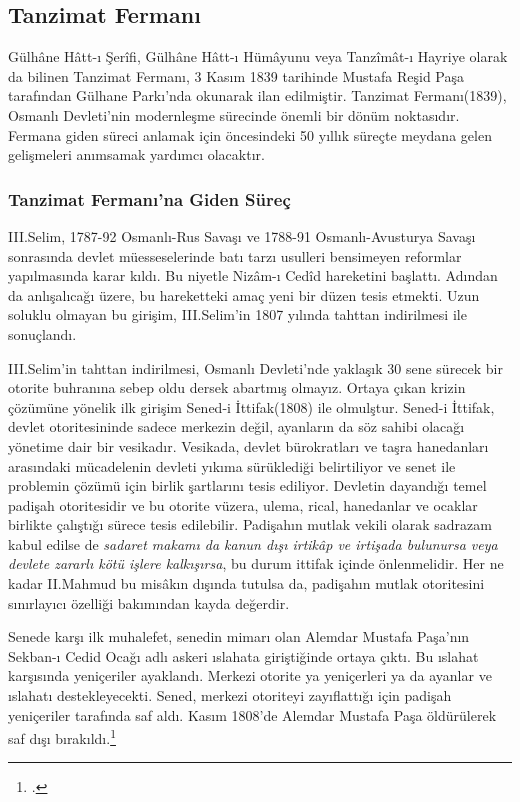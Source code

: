 \subsection{Tanzimat Fermanı}
\indent\indent Gülhâne Hâtt-ı Şerîfi, Gülhâne Hâtt-ı Hümâyunu veya Tanzîmât-ı Hayriye olarak da bilinen Tanzimat Fermanı, 3 Kasım 1839 tarihinde Mustafa Reşid Paşa tarafından Gülhane Parkı'nda okunarak ilan edilmiştir.
Tanzimat Fermanı(1839), Osmanlı Devleti'nin modernleşme sürecinde önemli bir dönüm noktasıdır. Fermana giden süreci anlamak için öncesindeki 50 yıllık süreçte meydana gelen gelişmeleri anımsamak yardımcı olacaktır.
\subsubsection{Tanzimat Fermanı'na Giden Süreç}
III.Selim, 1787-92 Osmanlı-Rus Savaşı ve 1788-91 Osmanlı-Avusturya Savaşı 
sonrasında devlet müesseselerinde batı tarzı usulleri bensimeyen reformlar yapılmasında karar kıldı. Bu niyetle Nizâm-ı Cedîd hareketini başlattı. Adından da 
anlışalıcağı üzere, bu hareketteki amaç yeni bir düzen tesis etmekti. Uzun soluklu olmayan bu girişim, III.Selim'in 1807 yılında tahttan indirilmesi ile sonuçlandı.

III.Selim'in tahttan indirilmesi, Osmanlı Devleti'nde yaklaşık 30 sene sürecek bir otorite buhranına sebep oldu dersek abartmış olmayız. 
Ortaya çıkan krizin çözümüne yönelik ilk girişim Sened-i İttifak(1808) ile olmulştur. Sened-i İttifak, devlet otoritesininde sadece merkezin değil, ayanların da söz sahibi olacağı yönetime dair bir vesikadır. 
Vesikada, devlet bürokratları ve taşra hanedanları arasındaki mücadelenin devleti yıkıma sürüklediği belirtiliyor ve senet ile problemin çözümü için birlik şartlarını tesis ediliyor. Devletin dayandığı temel padişah otoritesidir 
ve bu otorite vüzera, ulema, rical, hanedanlar ve ocaklar birlikte çalıştığı sürece tesis edilebilir. Padişahın mutlak vekili olarak sadrazam kabul edilse de \textit{sadaret makamı da kanun dışı 
irtikâp ve irtişada bulunursa veya devlete zararlı kötü işlere kalkışırsa}, bu durum ittifak içinde önlenmelidir. Her ne kadar II.Mahmud bu misâkın dışında tutulsa da, padişahın mutlak otoritesini sınırlayıcı özelliği bakımından kayda değerdir.

Senede karşı ilk muhalefet, senedin mimarı olan Alemdar Mustafa Paşa'nın Sekban-ı Cedid Ocağı adlı askeri ıslahata giriştiğinde ortaya çıktı. Bu ıslahat karşısında yeniçeriler ayaklandı. Merkezi otorite ya yeniçerleri ya da
ayanlar ve ıslahatı destekleyecekti. Sened, merkezi otoriteyi zayıflattığı için padişah yeniçeriler tarafında saf aldı. Kasım 1808'de Alemdar Mustafa Paşa öldürülerek saf dışı bırakıldı.\footcite[139]{tanzimat}

